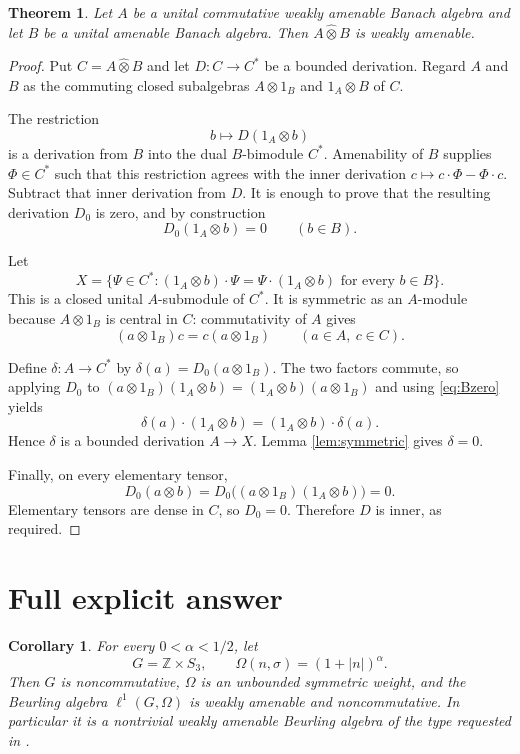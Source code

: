 \documentclass[11pt]{article}
\newtheorem{theorem}{Theorem}
\newtheorem{corollary}{Corollary}
\newcommand{\Z}{\mathbb Z}
\begin{document}
\begin{theorem}\label{thm:tensor}
Let $A$ be a unital commutative weakly amenable Banach algebra and let $B$ be
a unital amenable Banach algebra.  Then
$A\widehat\otimes B$ is weakly amenable.
\end{theorem}

\begin{proof}
Put $C=A\widehat\otimes B$ and let $D:C\to C^*$ be a bounded derivation.
Regard $A$ and $B$ as the commuting closed subalgebras
$A\otimes 1_B$ and $1_A\otimes B$ of $C$.

The restriction
\[
       b\longmapsto D(1_A\otimes b)
\]
is a derivation from $B$ into the dual $B$-bimodule $C^*$.  Amenability of
$B$ supplies $\Phi\in C^*$ such that this restriction agrees with the inner
derivation $c\mapsto c\cdot\Phi-\Phi\cdot c$.  Subtract that inner derivation
from $D$.  It is enough to prove that the resulting derivation $D_0$ is zero,
and by construction
\begin{equation}\label{eq:Bzero}
                D_0(1_A\otimes b)=0\qquad(b\in B).
\end{equation}

Let
\[
 X=\{\Psi\in C^*:(1_A\otimes b)\cdot\Psi
                  =\Psi\cdot(1_A\otimes b)\text{ for every }b\in B\}.
\]
This is a closed unital $A$-submodule of $C^*$.  It is symmetric as an
$A$-module because $A\otimes1_B$ is central in $C$: commutativity of $A$
gives
\[
        (a\otimes1_B)c=c(a\otimes1_B)\qquad(a\in A,\ c\in C).
\]

Define $\delta:A\to C^*$ by $\delta(a)=D_0(a\otimes1_B)$.  The two factors
commute, so applying $D_0$ to
$(a\otimes1_B)(1_A\otimes b)=(1_A\otimes b)(a\otimes1_B)$ and using
\eqref{eq:Bzero} yields
\[
  \delta(a)\cdot(1_A\otimes b)
     =(1_A\otimes b)\cdot\delta(a).
\]
Hence $\delta$ is a bounded derivation $A\to X$.  Lemma
\ref{lem:symmetric} gives $\delta=0$.

Finally, on every elementary tensor,
\[
 D_0(a\otimes b)
 =D_0\big((a\otimes1_B)(1_A\otimes b)\big)=0.
\]
Elementary tensors are dense in $C$, so $D_0=0$.  Therefore $D$ is inner,
as required.
\end{proof}

\section{Full explicit answer}

\begin{corollary}\label{cor:example}
For every $0<\alpha<1/2$, let
\[
   G=\Z\times S_3,
   \qquad
   \Omega(n,\sigma)=(1+|n|)^\alpha.
\]
Then $G$ is noncommutative, $\Omega$ is an unbounded symmetric weight, and
the Beurling algebra $\ell^1(G,\Omega)$ is weakly amenable and
noncommutative.  In particular it is a nontrivial weakly amenable Beurling
algebra of the type requested in \cite{SZ,Zhang}.
\end{corollary}
\end{document}
